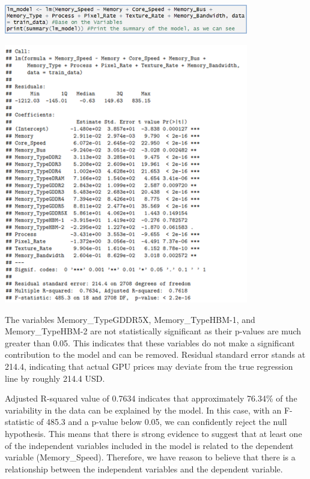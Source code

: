 \begin{center}
    \includegraphics[width=0.8\textwidth]{Build-model.png}
\end{center}

\begin{center}
    \includegraphics[width=0.8\textwidth]{Build-model1.png}
\end{center}

\tab The variables Memory\_TypeGDDR5X, Memory\_TypeHBM-1, and 
Memory\_TypeHBM-2 are not statistically significant as their p-values are much greater than 0.05. This indicates that these variables do not make a significant contribution to the model and can be removed. Residual standard error stands at 214.4, indicating that actual GPU prices may deviate from the true regression line by roughly 214.4 USD. 

\tab Adjusted R-squared value of 0.7634 indicates that approximately 76.34\% of the variability in the data can be explained by the model. In this case, with an F-statistic of 485.3 and a p-value below 0.05, we can confidently reject the null hypothesis. This means that there is strong evidence to suggest that at least one of the independent variables included in the model is related to the dependent variable (Memory\_Speed). Therefore, we have reason to believe that there is a relationship between the independent variables and the dependent variable.

